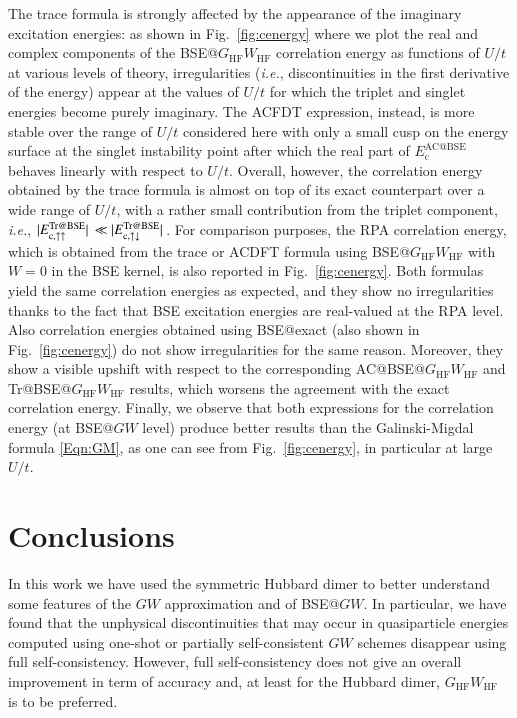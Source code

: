 \documentclass[aps,prb,reprint,superscriptaddress]{revtex4-1}
\makeatletter
\newcommand{\singlet}{\uparrow\downarrow}
\newcommand{\triplet}{\uparrow\uparrow}
\newcommand{\EcTr}[1]{E_{\text{c},#1}^\text{Tr@BSE}}
\newcommand{\EcACBSE}{E_\text{c}^\text{AC@BSE}}
\newcommand{\ie}{\textit{i.e.}}
\makeatother
\begin{document}
The trace formula is strongly affected by the appearance of the imaginary excitation energies: as shown in Fig.~\ref{fig:cenergy} where we plot the real and complex components of the BSE@$G_\text{HF}W_\text{HF}$ correlation energy as functions of $U/t$ at various levels of theory, irregularities (\ie, discontinuities in the first derivative of the energy) appear at the values of $U/t$ for which the triplet and singlet energies become purely imaginary.  The ACFDT expression, instead, is more stable over the range of $U/t$ considered here with only a small cusp on the energy surface at the singlet instability point after which the real part of $\EcACBSE$ behaves linearly with respect to $U/t$.
Overall, however, the correlation energy obtained by the trace formula is almost on top of its exact counterpart over a wide range of $U/t$, with a rather small contribution from the triplet component, \ie, $\abs*{\EcTr{\triplet}} \ll \abs*{\EcTr{\singlet}}$. 
For comparison purposes, the RPA correlation energy, which is obtained from the trace or ACDFT formula using BSE@$G_{\text{HF}}W_{\text{HF}}$ with $W=0$ in the BSE kernel, is also reported in Fig.~\ref{fig:cenergy}. Both formulas yield the same correlation energies as expected, and they show no irregularities thanks to the fact that BSE excitation energies are real-valued at the RPA level. Also correlation energies obtained using BSE@exact (also shown in Fig.~\ref{fig:cenergy}) do not show irregularities for the same reason. Moreover, they show a visible upshift with respect to the corresponding  AC@BSE@$G_{\text{HF}}W_{\text{HF}}$ and Tr@BSE@$G_{\text{HF}}W_{\text{HF}}$ results, which worsens the agreement with the exact correlation energy. Finally, we observe that both expressions for the correlation energy (at BSE@$GW$ level) produce better results than the Galinski-Migdal formula \eqref{Eqn:GM}, as one can see from Fig.~\ref{fig:cenergy}, in particular at large $U/t$. 



\section{Conclusions}
\label{sec:Conclusions}

In this work we have used the symmetric Hubbard dimer to better understand some features of the $GW$ approximation and of BSE@$GW$. In particular, we have found that the unphysical discontinuities that may occur in quasiparticle energies computed using one-shot or partially self-consistent $GW$ schemes disappear using full self-consistency. However, full self-consistency does not give an overall improvement in term of accuracy and, at least for the Hubbard dimer, $G_{\text{HF}}W_{\text{HF}}$ is to be preferred. 
\end{document}
